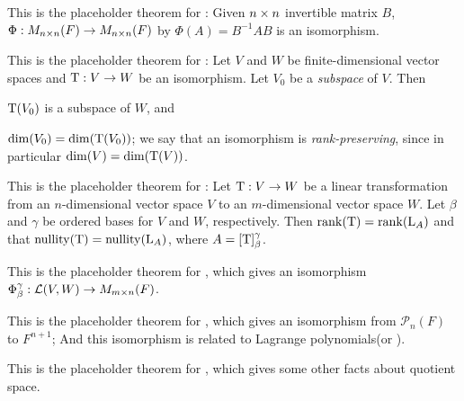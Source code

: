 \begin{additional theorem} \label{athm 2.40}
This is the placeholder theorem for :
Given \(n \times n\) invertible matrix \(B\),
\(\Phi : M_{n \times n}(F) \to M_{n \times n}(F)\) by \(\Phi(A) = B^{-1}AB\) is an isomorphism.
\end{additional theorem}

\begin{additional theorem} \label{athm 2.41}
This is the placeholder theorem for :
Let \(V\) and \(W\) be finite-dimensional vector spaces and \(\mathrm{T} : V \to W\) be an isomorphism.
Let \(V_0\) be a \emph{subspace} of \(V\).
Then

 \(\mathrm{T}(V_0)\) is a subspace of \(W\), and

 \(\dim(V_0) = \dim(\mathrm{T}(V_0))\);
    we say that an isomorphism is \emph{rank-preserving}, since in particular \(\dim(V) = \dim(\mathrm{T}(V))\).
\end{additional theorem}

\begin{additional theorem} \label{athm 2.42}
This is the placeholder theorem for :
Let \(\mathrm{T}: V \to W\) be a linear transformation from an \(n\)-dimensional vector space \(V\) to an \(m\)-dimensional vector space \(W\).
Let \(\beta\) and \(\gamma\) be ordered bases for \(V\) and \(W\), respectively.
Then \(\mathrm{rank}(\mathrm{T}) = \mathrm{rank}(\mathrm{L}_A)\) and that \(\mathrm{nullity}(\mathrm{T}) = \mathrm{nullity}(\mathrm{L}_A)\), where \(A = [\mathrm{T}]_{\beta}^{\gamma}\).
\end{additional theorem}

\begin{additional theorem} \label{athm 2.43}
This is the placeholder theorem for , which gives an isomorphism \(\Phi_{\beta}^{\gamma} : \mathcal{L}(V, W) \to M_{m \times n}(F)\).
\end{additional theorem}

\begin{additional theorem} \label{athm 2.44}
This is the placeholder theorem for , which gives an isomorphism from \(\mathcal{P}_n(F)\) to \(F^{n + 1}\);
And this isomorphism is related to Lagrange polynomials(or ).
\end{additional theorem}

\begin{additional theorem} \label{athm 2.45}
This is the placeholder theorem for , which gives some other facts about quotient space.
\end{additional theorem}